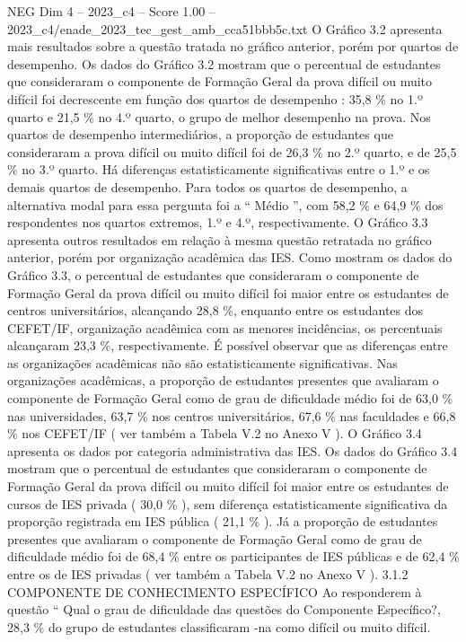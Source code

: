 \begin{textsample}{NEG Dim 4 – 2023\_c4 – Score 1.00 – 2023\_c4/enade\_2023\_tec\_gest\_amb\_cca51bbb5c.txt}
O Gráfico 3.2 apresenta mais resultados sobre a questão tratada no gráfico anterior, porém por quartos de desempenho.
Os dados do Gráfico 3.2 mostram que o percentual de estudantes que consideraram o componente de Formação Geral da prova difícil ou muito difícil foi decrescente em função dos quartos de desempenho : 35,8 \% no 1.º quarto e 21,5 \% no 4.º quarto, o grupo de melhor desempenho na prova.
Nos quartos de desempenho intermediários, a proporção de estudantes que consideraram a prova difícil ou muito difícil foi de 26,3 \% no 2.º quarto, e de 25,5 \% no 3.º quarto.
Há diferenças estatisticamente significativas entre o 1.º e os demais quartos de desempenho.
Para todos os quartos de desempenho, a alternativa modal para essa pergunta foi a “ Médio ”, com 58,2 \% e 64,9 \% dos respondentes nos quartos extremos, 1.º e 4.º, respectivamente.
O Gráfico 3.3 apresenta outros resultados em relação à mesma questão retratada no gráfico anterior, porém por organização acadêmica das IES.
Como mostram os dados do Gráfico 3.3, o percentual de estudantes que consideraram o componente de Formação Geral da prova difícil ou muito difícil foi maior entre os estudantes de centros universitários, alcançando 28,8 \%, enquanto entre os estudantes dos CEFET/IF, organização acadêmica com as menores incidências, os percentuais alcançaram 23,3 \%, respectivamente.
É possível observar que as diferenças entre as organizações acadêmicas não são estatisticamente significativas.
Nas organizações acadêmicas, a proporção de estudantes presentes que avaliaram o componente de Formação Geral como de grau de dificuldade médio foi de 63,0 \% nas universidades, 63,7 \% nos centros universitários, 67,6 \% nas faculdades e 66,8 \% nos CEFET/IF ( ver também a Tabela V.2 no Anexo V ).
O Gráfico 3.4 apresenta os dados por categoria administrativa das IES.
Os dados do Gráfico 3.4 mostram que o percentual de estudantes que consideraram o componente de Formação Geral da prova difícil ou muito difícil foi maior entre os estudantes de cursos de IES privada ( 30,0 \% ), sem diferença estatisticamente significativa da proporção registrada em IES pública ( 21,1 \% ).
Já a proporção de estudantes presentes que avaliaram o componente de Formação Geral como de grau de dificuldade médio foi de 68,4 \% entre os participantes de IES públicas e de 62,4 \% entre os de IES privadas ( ver também a Tabela V.2 no Anexo V ). 3.1.2 COMPONENTE DE CONHECIMENTO ESPECÍFICO Ao responderem à questão “ Qual o grau de dificuldade das questões do Componente Específico?, 28,3 \% do grupo de estudantes classificaram -na como difícil ou muito difícil.

\end{textsample}
